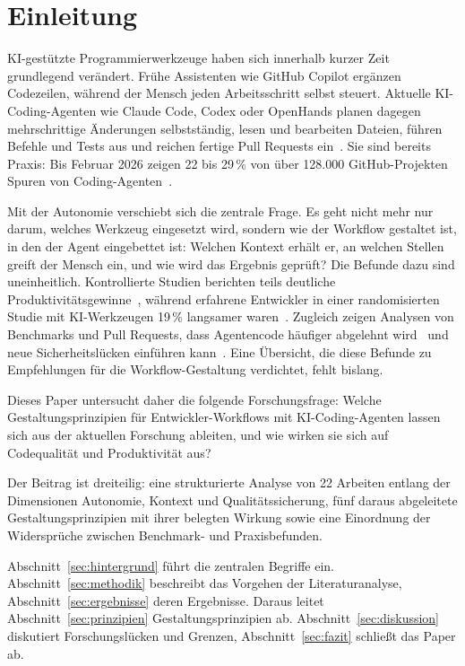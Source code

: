 \section{Einleitung}
\label{sec:einleitung}

KI-gestützte Programmierwerkzeuge haben sich innerhalb kurzer Zeit grundlegend verändert. Frühe Assistenten wie GitHub Copilot ergänzen Codezeilen, während der Mensch jeden Arbeitsschritt selbst steuert. Aktuelle KI-Coding-Agenten wie Claude Code, Codex oder OpenHands planen dagegen mehrschrittige Änderungen selbstständig, lesen und bearbeiten Dateien, führen Befehle und Tests aus und reichen fertige Pull Requests ein~\cite{liu2024agentsurvey,chen2025codewithme}. Sie sind bereits Praxis: Bis Februar 2026 zeigen 22 bis 29\,\% von über 128.000 GitHub-Projekten Spuren von Coding-Agenten~\cite{robbes2026agenticmuch}.

Mit der Autonomie verschiebt sich die zentrale Frage. Es geht nicht mehr nur darum, welches Werkzeug eingesetzt wird, sondern wie der Workflow gestaltet ist, in den der Agent eingebettet ist: Welchen Kontext erhält er, an welchen Stellen greift der Mensch ein, und wie wird das Ergebnis geprüft? Die Befunde dazu sind uneinheitlich. Kontrollierte Studien berichten teils deutliche Produktivitätsgewinne~\cite{chen2025codewithme,cui2025genai}, während erfahrene Entwickler in einer randomisierten Studie mit KI-Werkzeugen 19\,\% langsamer waren~\cite{becker2025metr}. Zugleich zeigen Analysen von Benchmarks und Pull Requests, dass Agentencode häufiger abgelehnt wird~\cite{li2025aidev} und neue Sicherheitslücken einführen kann~\cite{sajadi2025patchsecurity}. Eine Übersicht, die diese Befunde zu Empfehlungen für die Workflow-Gestaltung verdichtet, fehlt bislang.

Dieses Paper untersucht daher die folgende Forschungsfrage: Welche Gestaltungsprinzipien für Entwickler-Workflows mit KI-Coding-Agenten lassen sich aus der aktuellen Forschung ableiten, und wie wirken sie sich auf Codequalität und Produktivität aus?

Der Beitrag ist dreiteilig: eine strukturierte Analyse von 22 Arbeiten entlang der Dimensionen Autonomie, Kontext und Qualitätssicherung, fünf daraus abgeleitete Gestaltungsprinzipien mit ihrer belegten Wirkung sowie eine Einordnung der Widersprüche zwischen Benchmark- und Praxisbefunden.

Abschnitt~\ref{sec:hintergrund} führt die zentralen Begriffe ein. Abschnitt~\ref{sec:methodik} beschreibt das Vorgehen der Literaturanalyse, Abschnitt~\ref{sec:ergebnisse} deren Ergebnisse. Daraus leitet Abschnitt~\ref{sec:prinzipien} Gestaltungsprinzipien ab. Abschnitt~\ref{sec:diskussion} diskutiert Forschungslücken und Grenzen, Abschnitt~\ref{sec:fazit} schließt das Paper ab.
